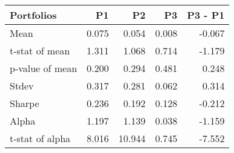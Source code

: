 \begin{tabular}{lrrrr}
\toprule
Portfolios & P1 & P2 & P3 & P3 - P1 \\
\midrule
Mean & 0.075 & 0.054 & 0.008 & -0.067 \\
t-stat of mean & 1.311 & 1.068 & 0.714 & -1.179 \\
p-value of mean & 0.200 & 0.294 & 0.481 & 0.248 \\
Stdev & 0.317 & 0.281 & 0.062 & 0.314 \\
Sharpe & 0.236 & 0.192 & 0.128 & -0.212 \\
Alpha & 1.197 & 1.139 & 0.038 & -1.159 \\
t-stat of alpha & 8.016 & 10.944 & 0.745 & -7.552 \\
\bottomrule
\end{tabular}
